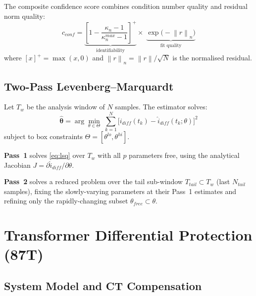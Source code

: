 \documentclass[12pt,a4paper]{article}
\newcommand{\norm}[1]{\left\lVert#1\right\rVert}
\newcommand{\kappan}{\kappa_n}
\newcommand{\hattheta}{\hat{\boldsymbol{\theta}}}
\begin{document}
The composite confidence score combines condition number quality and
residual norm quality:
\begin{equation}
  c_{conf} = \underbrace{\left[1 - \frac{\kappan - 1}{\kappan^{max} - 1}\right]^+}_{\text{identifiability}}
             \times\;
             \underbrace{\exp\!\bigl(-\norm{r}_n\bigr)}_{\text{fit quality}}
  \label{eq:confidence}
\end{equation}
where $[x]^+ = \max(x,0)$ and $\norm{r}_n = \norm{r}/\sqrt{N}$ is the
normalised residual.

\subsection{Two-Pass Levenberg--Marquardt}
\label{sec:twopass}

Let $T_w$ be the analysis window of $N$ samples.  The estimator solves:
\begin{equation}
  \hattheta = \arg\min_{\theta \in \Theta}\;
  \sum_{k=1}^{N} \bigl[i_{diff}(t_k) - \hat{i}_{diff}(t_k;\theta)\bigr]^2
  \label{eq:lsq}
\end{equation}
subject to box constraints $\Theta = [\theta^{lo}, \theta^{hi}]$.

\textbf{Pass~1} solves \eqref{eq:lsq} over $T_w$ with all $p$ parameters
free, using the analytical Jacobian $J = \partial \hat{i}_{diff}/\partial\theta$.

\textbf{Pass~2} solves a reduced problem over the tail sub-window
$T_{tail} \subset T_w$ (last $N_{tail}$ samples), fixing the
slowly-varying parameters at their Pass~1 estimates and refining only
the rapidly-changing subset $\theta_{free} \subset \theta$.

\section{Transformer Differential Protection (87T)}
\label{sec:87T}

\subsection{System Model and CT Compensation}
\label{sec:87T_system}
\end{document}
